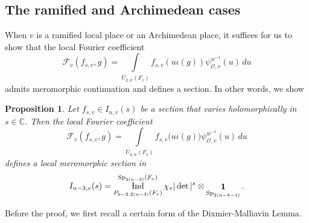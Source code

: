 \documentclass[11pt,notitlepage]{amsart}
\newtheorem{proposition}[theorem]{Proposition}
\theoremstyle{definition}
\theoremstyle{remark}
\newcommand{\calF}{\mathcal{F}}
\newcommand{\calO}{\mathcal{O}}
\newcommand{\bbC}{\mathbb{C}}
\DeclareMathOperator{\id}{{\bf 1}}
\DeclareMathOperator{\Sp}{Sp}
\DeclareMathOperator{\Ind}{Ind}
\begin{document}
\subsection{The ramified and Archimedean cases} When $v$ is a ramified local place or an Archimedean place, it suffices for us to show that the local Fourier coefficient
\begin{equation}
  \calF_v(f_{s,v},g) = \int\limits_{\overline{U}_{2,w}(F_v)}f_{s,v}(u\iota(g))\psi^{w^{-1}}_{\calO,v}(u)\,du
\end{equation}
admits meromorphic continuation and defines a section. In other words, we show
\begin{proposition}\label{prop52}
  Let $f_{s,v}\in I_{n,v}(s)$ be a section that varies holomorphically in $s\in\bbC$. Then the local Fourier coefficient
  \begin{equation*}
    \calF_v(f_{s,v},g) = \int\limits_{\overline{U}_{2,w}(F_v)}f_{s,v}\bigl(u\iota(g)\bigr)\psi^{w^{-1}}_{\calO,v}(u)\,du
  \end{equation*}
  defines a local meromorphic section in 
  \begin{equation*}
    I_{n-3,v}(s) = \Ind_{P_{k-2,2(n-3)}(F_v)}^{\Sp_{2(n-3)}(F_v)} \chi_v|\det|^{s}\otimes \id_{\Sp_{2(n-k-1)}}.
  \end{equation*}
\end{proposition}
Before the proof, we first recall a certain form of the Dixmier-Malliavin Lemma.
\end{document}

